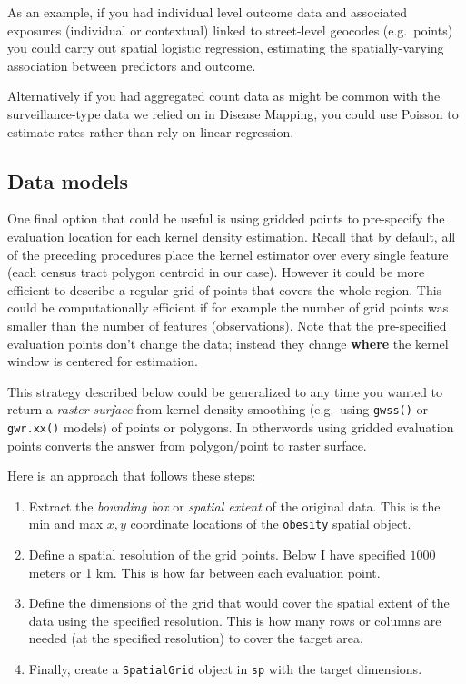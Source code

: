 \documentclass[
]{book}
\providecommand{\tightlist}{%
  \setlength{\itemsep}{0pt}\setlength{\parskip}{0pt}}
\newenvironment{rmdtip}[1]
  {
  \begin{itemize}
  \renewcommand{\labelitemi}{
    \raisebox{-.7\height}[0pt][0pt]{
      {\setkeys{Gin}{width=3em,keepaspectratio}\texttt{[image: images/\#1]}}
    }
  }
  \setlength{\fboxsep}{1em}
  \begin{tip}
  \item
  }
  {
  \end{tip}
  \end{itemize}
  }
\begin{document}
As an example, if you had individual level outcome data and associated exposures (individual or contextual) linked to street-level geocodes (e.g.~points) you could carry out spatial logistic regression, estimating the spatially-varying association between predictors and outcome.

Alternatively if you had aggregated count data as might be common with the surveillance-type data we relied on in Disease Mapping, you could use Poisson to estimate rates rather than rely on linear regression.

\hypertarget{data-models}{%
\subsection{Data models}\label{data-models}}

One final option that could be useful is using gridded points to pre-specify the evaluation location for each kernel density estimation. Recall that by default, all of the preceding procedures place the kernel estimator over every single feature (each census tract polygon centroid in our case). However it could be more efficient to describe a regular grid of points that covers the whole region. This could be computationally efficient if for example the number of grid points was smaller than the number of features (observations). Note that the pre-specified evaluation points don't change the data; instead they change \textbf{where} the kernel window is centered for estimation.

\begin{rmdtip}{tip}
This strategy described below could be generalized to any time you wanted to return a \emph{raster surface} from kernel density smoothing (e.g.~using \texttt{gwss()} or \texttt{gwr.xx()} models) of points or polygons. In otherwords using gridded evaluation points converts the answer from polygon/point to raster surface.

\end{rmdtip}

Here is an approach that follows these steps:

\begin{enumerate}
\def\labelenumi{\arabic{enumi}.}
\tightlist
\item
  Extract the \emph{bounding box} or \emph{spatial extent} of the original data. This is the min and max \(x,y\) coordinate locations of the \texttt{obesity} spatial object.
\item
  Define a spatial resolution of the grid points. Below I have specified \(1000\) meters or 1 km. This is how far between each evaluation point.
\item
  Define the dimensions of the grid that would cover the spatial extent of the data using the specified resolution. This is how many rows or columns are needed (at the specified resolution) to cover the target area.
\item
  Finally, create a \texttt{SpatialGrid} object in \texttt{sp} with the target dimensions.
\end{enumerate}
\end{document}
